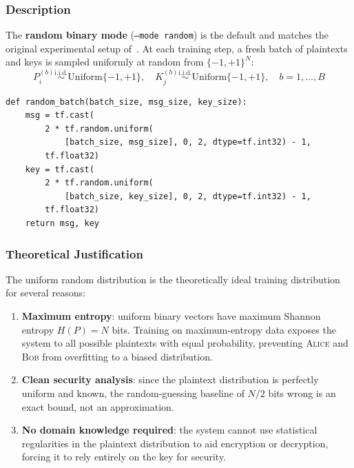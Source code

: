 \documentclass[12pt, a4paper]{article}
\newcommand{\alice}{\textsc{Alice}}
\newcommand{\bob}{\textsc{Bob}}
\newcommand{\code}[1]{\texttt{\color{CodeRed}#1}}
\begin{document}
\subsubsection*{Description}

The \textbf{random binary mode} (\code{--mode random}) is the default
and matches the original experimental setup of~\cite{abadi2016learning}.
At each training step, a fresh batch of plaintexts and keys is sampled
uniformly at random from $\{-1,+1\}^N$:
%
\begin{equation}
  P^{(b)}_i \overset{\mathrm{i.i.d.}}{\sim} \mathrm{Uniform}\{-1,+1\},
  \quad
  K^{(b)}_j \overset{\mathrm{i.i.d.}}{\sim} \mathrm{Uniform}\{-1,+1\},
  \quad b = 1,\ldots,B
  \label{eq:random_sampling}
\end{equation}

\begin{lstlisting}[caption={Random binary data generation}]
def random_batch(batch_size, msg_size, key_size):
    msg = tf.cast(
        2 * tf.random.uniform(
            [batch_size, msg_size], 0, 2, dtype=tf.int32) - 1,
        tf.float32)
    key = tf.cast(
        2 * tf.random.uniform(
            [batch_size, key_size], 0, 2, dtype=tf.int32) - 1,
        tf.float32)
    return msg, key
\end{lstlisting}

\subsubsection*{Theoretical Justification}

The uniform random distribution is the theoretically ideal training
distribution for several reasons:

\begin{enumerate}[leftmargin=2em, itemsep=4pt]
  \item \textbf{Maximum entropy}: uniform binary vectors have maximum
        Shannon entropy $H(P) = N$ bits. Training on maximum-entropy
        data exposes the system to all possible plaintexts with equal
        probability, preventing \alice{} and \bob{} from overfitting
        to a biased distribution.
  \item \textbf{Clean security analysis}: since the plaintext
        distribution is perfectly uniform and known, the random-guessing
        baseline of $N/2$ bits wrong is an exact bound, not an
        approximation.
  \item \textbf{No domain knowledge required}: the system cannot use
        statistical regularities in the plaintext distribution to aid
        encryption or decryption, forcing it to rely entirely on the
        key for security.
\end{enumerate}
\end{document}
